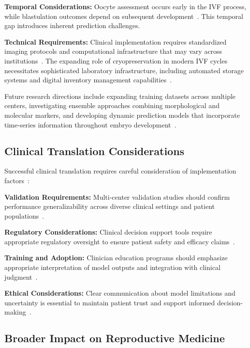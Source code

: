 \documentclass[pdflatex,sn-basic]{sn-jnl}%
\begin{document}
\textbf{Temporal Considerations:} Oocyte assessment occurs early in the IVF process, while blastulation outcomes depend on subsequent development~\cite{meseguer2011morphokinetics}. This temporal gap introduces inherent prediction challenges.

\textbf{Technical Requirements:} Clinical implementation requires standardized imaging protocols and computational infrastructure that may vary across institutions~\cite{mortimer2015quality}. The expanding role of cryopreservation in modern IVF cycles necessitates sophisticated laboratory infrastructure, including automated storage systems and digital inventory management capabilities~\cite{go2023deep}.

Future research directions include expanding training datasets across multiple centers, investigating ensemble approaches combining morphological and molecular markers, and developing dynamic prediction models that incorporate time-series information throughout embryo development~\cite{meseguer2011morphokinetics}.

\subsection{Clinical Translation Considerations}

Successful clinical translation requires careful consideration of implementation factors~\cite{fda2022clinical,rajkomar2019machine}:

\textbf{Validation Requirements:} Multi-center validation studies should confirm performance generalizability across diverse clinical settings and patient populations~\cite{varoquaux2022machine}.

\textbf{Regulatory Considerations:} Clinical decision support tools require appropriate regulatory oversight to ensure patient safety and efficacy claims~\cite{fda2021ai,fda2022clinical}.

\textbf{Training and Adoption:} Clinician education programs should emphasize appropriate interpretation of model outputs and integration with clinical judgment~\cite{topol2019high}.

\textbf{Ethical Considerations:} Clear communication about model limitations and uncertainty is essential to maintain patient trust and support informed decision-making~\cite{beauchamp2019principles}.

\subsection{Broader Impact on Reproductive Medicine}
\end{document}
